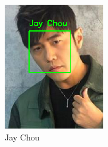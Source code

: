 \begin{figure}[!htb]
  \centering
  \begin{subfigure}[b]{0.3\linewidth}
    \includegraphics[width=\linewidth]{figures/false-recog-correct2.png}
    \caption{Jay Chou}
  \end{subfigure}
  \begin{subfigure}[b]{0.3\linewidth}

\end{subfigure}
\end{figure}
